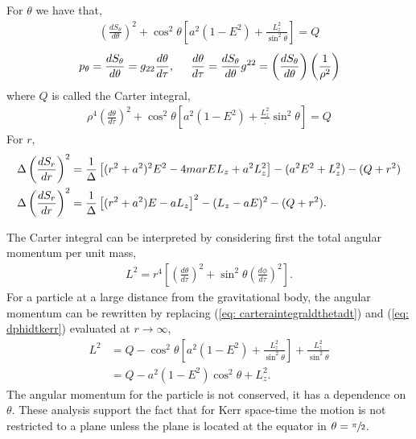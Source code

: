 For $\theta$ we have that, 
\begin{align}
	\left(\frac{dS_{\theta}}{d\theta}\right)^2 + \cos^2\theta\left[a^2(1-E^2)+\frac{L_z^2}{\sin^2\theta}\right] = Q
\end{align}
\begin{align*}
 p _\theta= \frac{dS_\theta}{d\theta} = g_{22}\frac{d\theta}{d\tau}, \hspace{0.5cm} \frac{d\theta}{d\tau} = \frac{dS_\theta}{d\theta}g^{22} = \left(\frac{dS_\theta}{d\theta}\right)\left(\frac{1}{\rho^2}\right)
\end{align*}
where $Q$ is called the Carter integral,
\begin{align}
\label{eq: carteraintegraldthetadt}
	\rho^4\left(\frac{d{\theta}}{d\tau}\right)^2 + \cos^2\theta\left[a^2(1-E^2)+\frac{L_z^2}.{\sin^2\theta}\right] = Q
\end{align}
For $r$,
\begin{align}
\notag
	&\Delta \left(\frac{dS_r}{dr}\right)^2  = \frac{1}{\Delta} \left[(r^2+a^2)^2E^2 - 4marEL_z + a^2L_z^2\right] - (a^2E^2 + L_z^2)- (Q+r^2)\\
	\label{eq: dSr/drhamiltonjacobi}
	&\Delta \left(\frac{dS_r}{dr}\right)^2  = \frac{1}{\Delta} \left[(r^2+a^2)E - aL_z\right]^2 - (L_z -aE)^2 - (Q+r^2).
\end{align}

The Carter integral can be interpreted by considering first the total angular momentum per unit mass,
\begin{align}
	L^2 = r^4\left[\left(\frac{d\theta}{d\tau}\right)^2 + \sin^2\theta \left(\frac{d\phi}{d\tau}\right)^2\right].
\end{align}
For a particle at a large distance from the gravitational body, the angular momentum can be rewritten by replacing (\ref{eq: carteraintegraldthetadt}) and  (\ref{eq: dphidtkerr}) evaluated at $r \rightarrow \infty$,
\begin{align}
	L^2 &= Q  - \cos^2\theta\left[a^2(1-E^2)+\frac{L_z^2}{\sin^2\theta}\right]  + \frac{L_z^2}{\sin^2\theta}\\
	&=Q - a^2(1-E^2)\cos^2\theta + L_z^2.
\end{align}
The angular momentum for the particle is not conserved, it has a dependence on $\theta$. These analysis support the fact that for Kerr space-time the motion is not restricted to a plane unless the plane is located at the equator in $\theta = \sfrac{\pi}{2}$.

